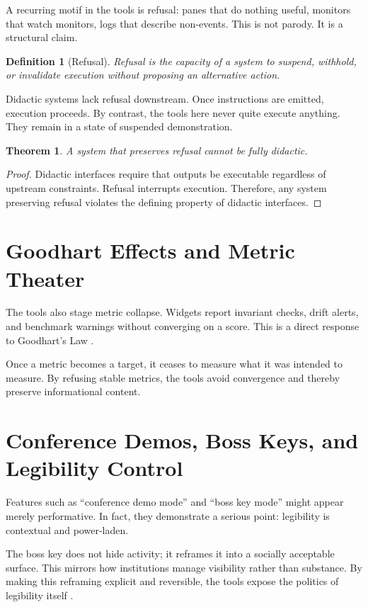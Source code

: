 \documentclass[11pt]{article}
\newtheorem{definition}{Definition}
\newtheorem{theorem}{Theorem}
\begin{document}
A recurring motif in the tools is refusal: panes that do nothing useful,
monitors that watch monitors, logs that describe non-events. This is not parody.
It is a structural claim.

\begin{definition}[Refusal]
Refusal is the capacity of a system to suspend, withhold, or invalidate execution
without proposing an alternative action.
\end{definition}

Didactic systems lack refusal downstream. Once instructions are emitted,
execution proceeds. By contrast, the tools here never quite execute anything.
They remain in a state of suspended demonstration.

\begin{theorem}
A system that preserves refusal cannot be fully didactic.
\end{theorem}

\begin{proof}
Didactic interfaces require that outputs be executable regardless of upstream
constraints. Refusal interrupts execution. Therefore, any system preserving
refusal violates the defining property of didactic interfaces.
\end{proof}

\section{Goodhart Effects and Metric Theater}

The tools also stage metric collapse. Widgets report invariant checks, drift
alerts, and benchmark warnings without converging on a score. This is a direct
response to Goodhart's Law \cite{goodhart1975}.

Once a metric becomes a target, it ceases to measure what it was intended to
measure. By refusing stable metrics, the tools avoid convergence and thereby
preserve informational content.

\section{Conference Demos, Boss Keys, and Legibility Control}

Features such as ``conference demo mode'' and ``boss key mode'' might appear
merely performative. In fact, they demonstrate a serious point: legibility is
contextual and power-laden.

The boss key does not hide activity; it reframes it into a socially acceptable
surface. This mirrors how institutions manage visibility rather than substance.
By making this reframing explicit and reversible, the tools expose the politics
of legibility itself \cite{scott1998}.
\end{document}
